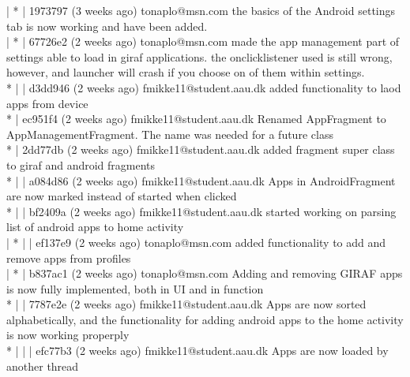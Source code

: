 | * | 1973797 (3 weeks ago) tonaplo@msn.com the basics of the Android settings tab is now working and have been added.\\
| * | 67726e2 (2 weeks ago) tonaplo@msn.com made the app management part of settings able to load in giraf applications. the onclicklistener used is still wrong, however, and launcher will crash if you choose on of them within settings.\\
* | | d3dd946 (2 weeks ago) fmikke11@student.aau.dk added functionality to laod apps from device\\
* | ec951f4 (2 weeks ago) fmikke11@student.aau.dk Renamed AppFragment to AppManagementFragment. The name was needed for a future class\\
* | 2dd77db (2 weeks ago) fmikke11@student.aau.dk added fragment super class to giraf and android fragments\\
* | | a084d86 (2 weeks ago) fmikke11@student.aau.dk Apps in AndroidFragment are now marked instead of started when clicked\\
* | | bf2409a (2 weeks ago) fmikke11@student.aau.dk started working on parsing list of android apps to home activity\\
| * | | ef137e9 (2 weeks ago) tonaplo@msn.com added functionality to add and remove apps from profiles\\
| * | b837ac1 (2 weeks ago) tonaplo@msn.com Adding and removing GIRAF apps is now fully implemented, both in UI and in function\\
* | | 7787e2e (2 weeks ago) fmikke11@student.aau.dk Apps are now sorted alphabetically, and the functionality for adding android apps to the home activity is now working properply\\
* | | | efc77b3 (2 weeks ago) fmikke11@student.aau.dk Apps are now loaded by another thread
